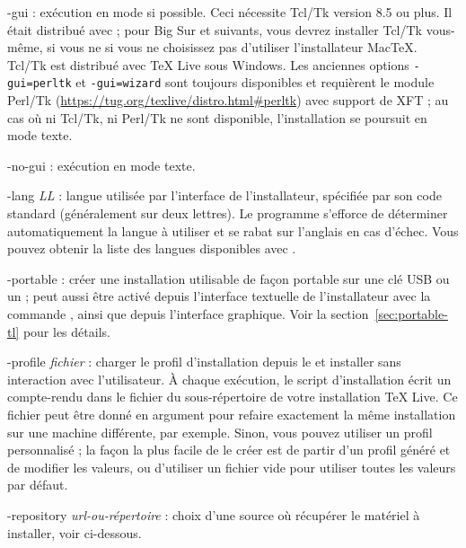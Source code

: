 \documentclass[german, english, french]{article}
\renewcommand{\TL}{\TeX{} Live\xspace}%
\begin{document}
\begin{ttdescription}
\item[-gui] : exécution en mode \GUI{} si possible. Ceci nécessite Tcl/Tk
  version 8.5 ou plus. Il était distribué avec \macOS ; pour Big Sur et
  suivants, vous devrez installer Tcl/Tk vous-même, si vous ne si vous ne
  choisissez pas d'utiliser l'installateur MacTeX. Tcl/Tk est distribué avec
  \TL{} sous Windows. Les anciennes options \texttt{-gui=perltk} et
  \texttt{-gui=wizard} sont toujours disponibles et requièrent le module Perl/Tk
  (\url{https://tug.org/texlive/distro.html#perltk}) avec support de XFT ; au
  cas où ni Tcl/Tk, ni Perl/Tk ne sont disponible, l'installation se poursuit en
  mode texte.

\item[-no-gui] : exécution en mode texte.

\item[-lang {\sl LL}] : langue utilisée par l'interface de l'installateur,
  spécifiée par son code standard (généralement sur deux lettres).  Le programme
  s'efforce de déterminer automatiquement la langue à utiliser et se rabat sur
  l'anglais en cas d'échec. Vous pouvez obtenir la liste des langues disponibles
  avec .

\item[-portable] : créer une installation utilisable de façon portable sur une
  clé USB ou un \DVD ; peut aussi être activé depuis l'interface textuelle de
  l'installateur avec la commande , ainsi que depuis l'interface
  graphique.  Voir la section~\ref{sec:portable-tl} pour les détails.

\item[-profile {\sl fichier}] : charger le profil d'installation depuis le
   et installer sans interaction avec l'utilisateur.  À chaque
  exécution, le script d'installation écrit un compte-rendu dans le fichier
   du sous-répertoire  de votre
  installation \TL. Ce fichier peut être donné en argument pour refaire
  exactement la même installation sur une machine différente, par
  exemple. Sinon, vous pouvez utiliser un profil personnalisé ; la façon la plus
  facile de le créer est de partir d'un profil généré et de modifier les
  valeurs, ou d'utiliser un fichier vide pour utiliser toutes les valeurs par
  défaut.

\item[-repository {\sl url-ou-répertoire}] : choix d'une source où récupérer le
  matériel à installer, voir ci-dessous.


\end{ttdescription}
\end{document}

